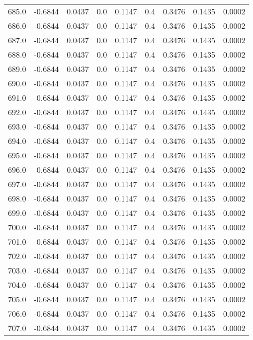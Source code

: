 \begin{longtable}{lrrrrrrrr}
685.0 & -0.6844 & 0.0437 & 0.0 & 0.1147 & 0.4 & 0.3476 & 0.1435 & 0.0002 \\
686.0 & -0.6844 & 0.0437 & 0.0 & 0.1147 & 0.4 & 0.3476 & 0.1435 & 0.0002 \\
687.0 & -0.6844 & 0.0437 & 0.0 & 0.1147 & 0.4 & 0.3476 & 0.1435 & 0.0002 \\
688.0 & -0.6844 & 0.0437 & 0.0 & 0.1147 & 0.4 & 0.3476 & 0.1435 & 0.0002 \\
689.0 & -0.6844 & 0.0437 & 0.0 & 0.1147 & 0.4 & 0.3476 & 0.1435 & 0.0002 \\
690.0 & -0.6844 & 0.0437 & 0.0 & 0.1147 & 0.4 & 0.3476 & 0.1435 & 0.0002 \\
691.0 & -0.6844 & 0.0437 & 0.0 & 0.1147 & 0.4 & 0.3476 & 0.1435 & 0.0002 \\
692.0 & -0.6844 & 0.0437 & 0.0 & 0.1147 & 0.4 & 0.3476 & 0.1435 & 0.0002 \\
693.0 & -0.6844 & 0.0437 & 0.0 & 0.1147 & 0.4 & 0.3476 & 0.1435 & 0.0002 \\
694.0 & -0.6844 & 0.0437 & 0.0 & 0.1147 & 0.4 & 0.3476 & 0.1435 & 0.0002 \\
695.0 & -0.6844 & 0.0437 & 0.0 & 0.1147 & 0.4 & 0.3476 & 0.1435 & 0.0002 \\
696.0 & -0.6844 & 0.0437 & 0.0 & 0.1147 & 0.4 & 0.3476 & 0.1435 & 0.0002 \\
697.0 & -0.6844 & 0.0437 & 0.0 & 0.1147 & 0.4 & 0.3476 & 0.1435 & 0.0002 \\
698.0 & -0.6844 & 0.0437 & 0.0 & 0.1147 & 0.4 & 0.3476 & 0.1435 & 0.0002 \\
699.0 & -0.6844 & 0.0437 & 0.0 & 0.1147 & 0.4 & 0.3476 & 0.1435 & 0.0002 \\
700.0 & -0.6844 & 0.0437 & 0.0 & 0.1147 & 0.4 & 0.3476 & 0.1435 & 0.0002 \\
701.0 & -0.6844 & 0.0437 & 0.0 & 0.1147 & 0.4 & 0.3476 & 0.1435 & 0.0002 \\
702.0 & -0.6844 & 0.0437 & 0.0 & 0.1147 & 0.4 & 0.3476 & 0.1435 & 0.0002 \\
703.0 & -0.6844 & 0.0437 & 0.0 & 0.1147 & 0.4 & 0.3476 & 0.1435 & 0.0002 \\
704.0 & -0.6844 & 0.0437 & 0.0 & 0.1147 & 0.4 & 0.3476 & 0.1435 & 0.0002 \\
705.0 & -0.6844 & 0.0437 & 0.0 & 0.1147 & 0.4 & 0.3476 & 0.1435 & 0.0002 \\
706.0 & -0.6844 & 0.0437 & 0.0 & 0.1147 & 0.4 & 0.3476 & 0.1435 & 0.0002 \\
707.0 & -0.6844 & 0.0437 & 0.0 & 0.1147 & 0.4 & 0.3476 & 0.1435 & 0.0002 \\

\end{longtable}
